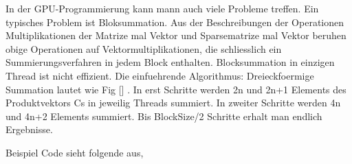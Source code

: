 
In der GPU-Programmierung kann mann auch viele Probleme treffen.
Ein typisches Problem ist Bloksummation. Aus der Beschreibungen der Operationen Multiplikationen der Matrize mal Vektor und Sparsematrize  mal Vektor beruhen obige Operationen auf Vektormultiplikationen, die schliesslich ein Summierungsverfahren in jedem Block enthalten. Blocksummation in einzigen Thread ist nicht effizient. Die einfuehrende Algorithmus: Dreieckfoermige Summation lautet wie Fig [] . In erst Schritte werden 2n und 2n+1 Elements des Produktvektors Cs in jeweilig Threads summiert. In zweiter Schritte werden 4n und 4n+2 Elements summiert. Bis BlockSize/2 Schritte erhalt man endlich Ergebnisse. 


Beispiel Code sieht folgende aus,

